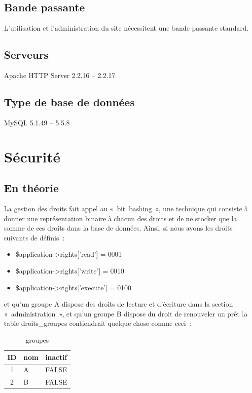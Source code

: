 \documentclass[letter, 10pt]{report}
\begin{document}
\subsection{Bande passante}
L'utilisation et l'administration du site nécessitent une bande passante standard.

\subsection{Serveurs}
Apache HTTP Server 2.2.16 -- 2.2.17

\subsection{Type de base de données}
MySQL 5.1.49 -- 5.5.8

\section{Sécurité}
\subsection{En théorie}

La gestion des droits fait appel au «~bit~bashing~», une technique qui consiste à donner une représentation binaire à chacun des droits et de ne stocker que la somme de ces droits dans la base de données. Ainsi, si nous avons les droits suivants de définis~:

\begin{itemize}
	\item \$application->rights['read'] = 0001
	\item \$application->rights['write'] = 0010
	\item \$application->rights['execute'] = 0100
\end{itemize}

et qu'un groupe A dispose des droits de lecture et d'écriture dans la section «~administration~», et qu'un groupe B dispose du droit de renouveler un prêt la table droits\_groupes contiendrait quelque chose comme ceci~:

\begin{table}[h!]
	\caption{groupes}
	\begin{center}
		\begin{tabular}{|c|l|l|}
			\hline
			ID & nom & inactif \\
			\hline
			1  & A   & FALSE \\
			2  & B   & FALSE \\
			\hline
		\end{tabular}
	\end{center}
\end{table}
\end{document}
